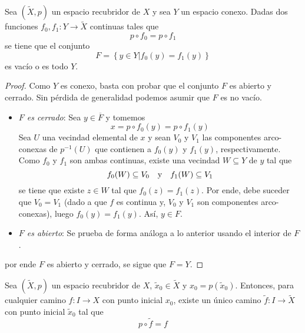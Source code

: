 \documentclass{article}
\theoremstyle{largebreak}
\newcommand\cf[3]{\ensuremath{#1:#2\rightarrow#3}}
\begin{document}
    \begin{lema}
        Sea $(\widetilde{X},p)$ un espacio recubridor de $X$ y sea $Y$ un espacio conexo. Dadas dos funciones $\cf{f_0,f_1}{Y}{\widetilde{X}}$ continuas tales que
        \begin{equation*}
            p\circ f_0=p\circ f_1
        \end{equation*}
        se tiene que el conjunto
        \begin{equation*}
            F=\left\{y\in Y\Big|f_0(y)=f_1(y) \right\}
        \end{equation*}
        es vacío o es todo $Y$.
    \end{lema}

    \begin{proof}
        Como $Y$ es conexo, basta con probar que el conjunto $F$ es abierto y cerrado. Sin pérdida de generalidad podemos asumir que $F$ es no vacío.
        \begin{itemize}
            \item \textit{$F$ es cerrado}: Sea $y\in\overline{F}$ y tomemos
            \begin{equation*}
                x=p\circ f_0(y)=p\circ f_1(y)
            \end{equation*}
            Sea $U$ una vecindad elemental de $x$ y sean $V_0$ y $V_1$ las componentes arco-conexas de $p^{-1}(U)$ que contienen a $f_0(y)$ y $f_1(y)$, respectivamente. Como $f_0$ y $f_1$ son ambas continuas, existe una vecindad $W\subseteq Y$ de $y$ tal que
            \begin{equation*}
                f_0(W)\subseteq V_0\quad\textup{y}\quad f_1(W)\subseteq V_1
            \end{equation*}
            se tiene que existe $z\in W$ tal que $f_0(z)=f_1(z)$. Por ende, debe suceder que $V_0=V_1$ (dado a que $f$ es continua y, $V_0$ y $V_1$ son componentes arco-conexas), luego $f_0(y)=f_1(y)$. Así, $y\in F$.
            \item \textit{$F$ es abierto}: Se prueba de forma análoga a lo anterior usando el interior de $F$.
        \end{itemize}
        por ende $F$ es abierto y cerrado, se sigue que $F=Y$.
    \end{proof}

    \begin{lema}
        \label{lemaF1}
        Sea $(\widetilde{X},p)$ un espacio recubridor de $X$, $\widetilde{x}_0\in\widetilde{X}$ y $x_0=p(\widetilde{x}_0)$. Entonces, para cualquier camino $\cf{f}{I}{X}$ con punto inicial $x_0$, existe un único camino $\cf{\widetilde{f}}{I}{\widetilde{X}}$ con punto inicial $\widetilde{x}_0$ tal que
        \begin{equation*}
            p\circ \widetilde{f} =f
        \end{equation*}
    \end{lema}
\end{document}
